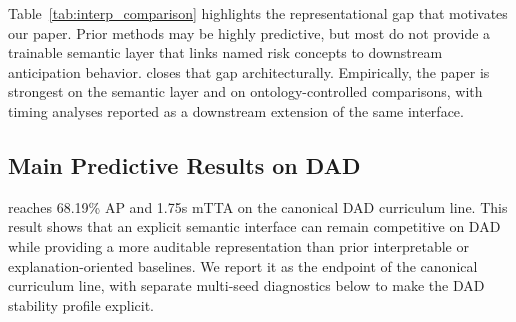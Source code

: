 Table~\ref{tab:interp_comparison} highlights the representational gap that
motivates our paper. Prior methods may be highly predictive, but most do not
provide a trainable semantic layer that links named risk concepts to downstream
anticipation behavior. \method{} closes that gap architecturally. Empirically,
the paper is strongest on the semantic layer and on ontology-controlled
comparisons, with timing analyses reported as a downstream extension of the
same interface.

\subsection{Main Predictive Results on DAD}

\begin{table}[t]
\caption{[Headline evidence] DAD results. We separate interpretable or
explanation-oriented methods
from strong non-interpretable references to position \method{} as a competitive
interpretable system with an explicit semantic interface.}
\label{tab:dad}
\centering\footnotesize
\TableStyleOn
\setlength{\tabcolsep}{4pt}
\TableStyleOff
\end{table}

\method{} reaches 68.19\% AP and 1.75s mTTA on the canonical DAD curriculum
line. This result shows that an explicit semantic interface can remain
competitive on DAD while providing a more auditable representation than prior
interpretable or explanation-oriented baselines. We report it as the endpoint
of the canonical curriculum line, with separate multi-seed diagnostics below to
make the DAD stability profile explicit.

